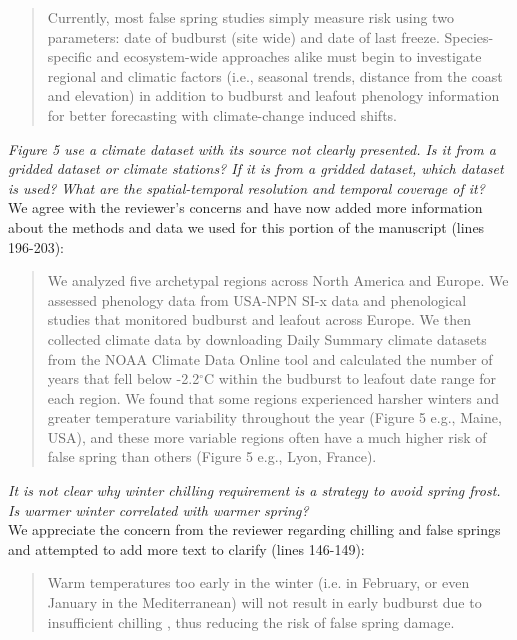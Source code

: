 \documentclass[11pt,a4paper]{article}
\begin{document}
\begin{quote}
Currently, most false spring studies simply measure risk using two parameters: date of budburst (site wide) and date of last freeze. Species-specific and ecosystem-wide approaches alike must begin to investigate regional and climatic factors (i.e., seasonal trends, distance from the coast and elevation) in addition to budburst and leafout phenology information for better forecasting with climate-change induced shifts. 
\end{quote}

\textit{Figure 5 use a climate dataset with its source not clearly presented. Is it from a gridded dataset or climate stations? If it is from a gridded dataset, which dataset is used? What are the spatial-temporal resolution and temporal coverage of it?} \\

We agree with the reviewer's concerns and have now added more information about the methods and data we used for this portion of the manuscript (lines 196-203): \\

\begin{quote}
We analyzed five archetypal regions across North America and Europe. We assessed phenology data from USA-NPN SI-x data and phenological studies that monitored budburst and leafout across Europe. We then collected climate data by downloading Daily Summary climate datasets from the NOAA Climate Data Online tool \citep{NOAA} and calculated the number of years that fell below -2.2$^{\circ}$C within the budburst to leafout date range for each region. We found that some regions experienced harsher winters and greater temperature variability throughout the year (Figure 5 e.g., Maine, USA), and these more variable regions often have a much higher risk of false spring than others (Figure 5 e.g., Lyon, France).
\end{quote} 

\textit{It is not clear why winter chilling requirement is a strategy to avoid spring frost. Is warmer winter correlated with warmer spring?} \\

We appreciate the concern from the reviewer regarding chilling and false springs and attempted to add more text to clarify (lines 146-149): \\

\begin{quote}
Warm temperatures too early in the winter (i.e. in February, or even January in the Mediterranean) will not result in early budburst due to insufficient chilling \citep{Basler2012}, thus reducing the risk of false spring damage.
\end{quote} 
\end{document}
